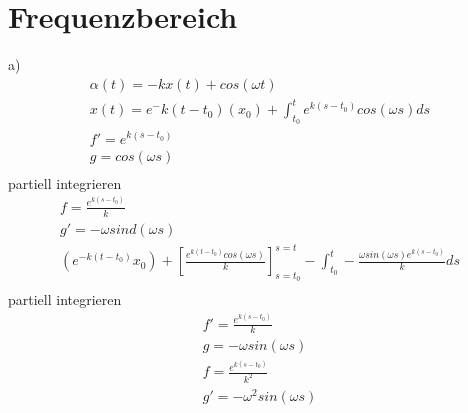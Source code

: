 \section{Frequenzbereich}\label{sec:ag3_2}
a)
\begin{gather*}
\alpha(t)=-kx(t)+cos(\omega t)\\
x(t)=e{^-k(t-t_0)}(x_0)+\int_{t_0}^{t} e^{k(s-t_0)}cos(\omega s)ds\\
f'=e^{k(s-t_0)}\\
g=cos(\omega s)\\
\end{gather*}
partiell integrieren
\begin{gather*}
f=\frac{e^{k(s-t_0)}}{k}\\
g'=-\omega sind(\omega s)\\
(e^{-k(t-t_0)}x_0)+[\frac{e^{k(t-t_0)}cos(\omega s)}{k}]^{s=t}_{s=t_0}-\int_{t_0}^{t}-\frac{\omega sin(\omega s)e^{k(s-t_0)}}{k}ds\\
\end{gather*}
partiell integrieren
\begin{gather*}
f'=\frac{e^{k(s-t_0)}}{k}\\
g=-\omega sin(\omega s)\\
f=\frac{e^{k(s-t_0)}}{k^2}\\
g'=-\omega^2 sin(\omega s)\\
\end{gather*}
